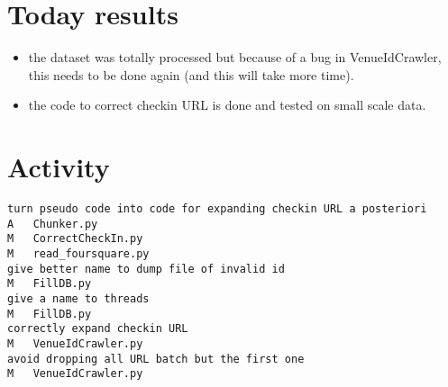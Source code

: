 \section*{Today results}
\begin{itemize}
	\item the dataset was totally processed but because of a bug in
		VenueIdCrawler, this needs to be done again (and this will take more
		time).
	\item the code to correct checkin URL is done and tested on small scale
		data.
\end{itemize}

\section*{Activity}
\begin{verbatim}
turn pseudo code into code for expanding checkin URL a posteriori
A	Chunker.py
M	CorrectCheckIn.py
M	read_foursquare.py
give better name to dump file of invalid id
M	FillDB.py
give a name to threads
M	FillDB.py
correctly expand checkin URL
M	VenueIdCrawler.py
avoid dropping all URL batch but the first one
M	VenueIdCrawler.py
\end{verbatim}
